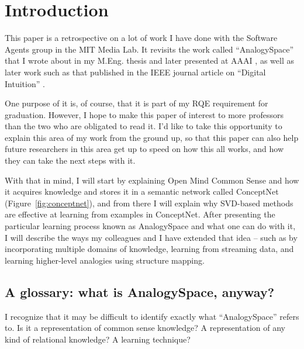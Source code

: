 \documentclass[11pt]{article}
\begin{document}
\newpage
{}

\section{Introduction}

This paper is a retrospective on a lot of work I have done with the Software
Agents group in the MIT Media Lab. It revisits the work called ``AnalogySpace''
that I wrote about in my M.Eng. thesis and later presented at AAAI \cite{analogyspace},
as well as later work such as that published in the IEEE journal article on
``Digital Intuition'' \cite{ieee}.

One purpose of it is, of course, that it is
part of my RQE requirement for graduation. However, I hope to make this paper
of interest to more professors than the two who are obligated to read it.  I'd
like to take this opportunity to explain this area of my work from the ground
up, so that this paper can also help future researchers in this area get up to
speed on how this all works, and how they can take the next steps with it.

With that in mind, I will start by explaining Open Mind Common Sense and how it
acquires knowledge and stores it in a semantic network called ConceptNet (Figure~\ref{fig:conceptnet}), and from there I will explain
why SVD-based methods are effective at learning from examples in ConceptNet.
After presenting the particular learning process known as AnalogySpace and what
one can do with it, I will describe the ways my colleagues and I have extended
that idea -- such as by incorporating multiple domains of knowledge, learning
from streaming data, and learning higher-level analogies using structure
mapping.

\subsection{A glossary: what is AnalogySpace, anyway?}

I recognize that it may be difficult to identify exactly what ``AnalogySpace''
refers to. Is it a representation of common sense knowledge? A representation
of any kind of relational knowledge? A learning technique?

\end{document}
